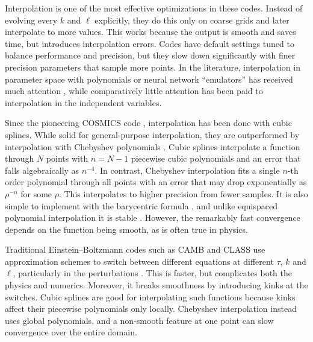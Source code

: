 \documentclass{aa}
\newcommand\EB{Einstein–Boltzmann}
\begin{document}
Interpolation is one of the most effective optimizations in these codes.
Instead of evolving every $k$ and $\ell$ explicitly,
they do this only on coarse grids and later interpolate to more values.
This works because the output is smooth and saves time, but introduces interpolation errors.
Codes have default settings tuned to balance performance and precision,
but they slow down significantly with finer precision parameters that sample more points.
In the literature,
interpolation in parameter space with polynomials or neural network \enquote{emulators} has received much attention
\citep[e.g.][]{fendtPicoParametersImpatient2007,albersCosmicNetPhysicsdrivenImplementation2019a,manciniCOSMOPOWEREmulatingCosmological2022,boniciCapsejlEfficientAutodifferentiable2024a},
while comparatively little attention has been paid to interpolation in the independent variables.

Since the pioneering COSMICS code \citep{maCosmologicalPerturbationTheory1995},
interpolation has been done with cubic splines.
While solid for general-purpose interpolation,
they are outperformed by interpolation with Chebyshev polynomials \citep{trefethenApproximationTheoryApproximation2019}.
Cubic splines interpolate a function through $N$ points with $n=N-1$ piecewise cubic polynomials and an error that falls algebraically as $n^{-4}$.
In contrast, Chebyshev interpolation fits a single $n$-th order polynomial through all points with an error that may drop exponentially as $\rho^{-n}$ for some $\rho$.
This interpolates to higher precision from fewer samples.
It is also simple to implement with the barycentric formula \citep{berrutBarycentricLagrangeInterpolation2004},
and unlike equispaced polynomial interpolation it is stable \citep{trefethenSixMythsPolynomial}.
However, the remarkably fast convergence depends on the function being smooth,
as is often true in physics.

Traditional \EB{} codes such as CAMB and CLASS use approximation schemes to switch between different equations at different $\tau$, $k$ and $\ell$,
particularly in the perturbations \citep[notably Figure 10]{blasCosmicLinearAnisotropy2011b}.
This is faster, but complicates both the physics and numerics.
Moreover, it breaks smoothness by introducing kinks at the switches.
Cubic splines are good for interpolating such functions because kinks affect their piecewise polynomials only locally.
Chebyshev interpolation instead uses global polynomials, and a non-smooth feature at one point can slow convergence over the entire domain.
\end{document}
